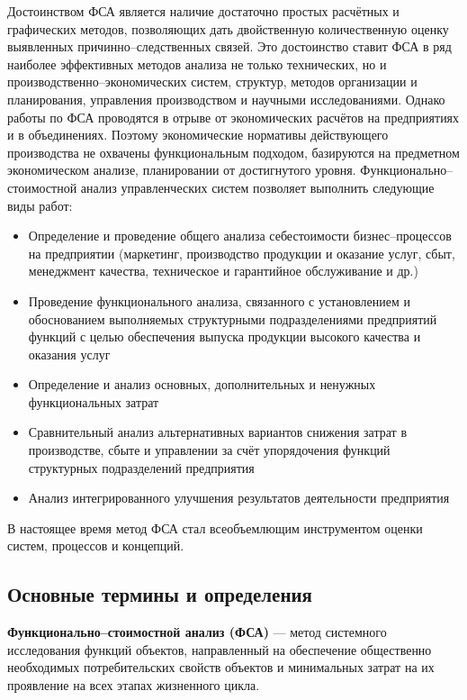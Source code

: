 Достоинством ФСА является наличие достаточно простых расчётных и графических
методов, позволяющих дать двойственную количественную оценку выявленных
причинно--следственных связей. Это достоинство ставит ФСА в ряд наиболее
эффективных методов анализа не только технических, но и
производственно--экономических систем, структур, методов организации и
планирования, управления производством и научными исследованиями. Однако работы
по ФСА проводятся в отрыве от экономических расчётов на предприятиях и в
объединениях.
Поэтому экономические нормативы действующего производства не охвачены
функциональным подходом, базируются на предметном экономическом анализе,
планировании от достигнутого уровня.
Функционально--стоимостной анализ управленческих систем позволяет выполнить
следующие виды работ:
\begin{itemize}
    \item Определение и проведение общего анализа себестоимости
    бизнес--процессов на предприятии (маркетинг, производство продукции и
    оказание услуг, сбыт, менеджмент качества, техническое и гарантийное
    обслуживание и др.)
    \item Проведение функционального анализа, связанного с установлением и
    обоснованием выполняемых структурными подразделениями предприятий функций с
    целью обеспечения выпуска продукции высокого качества и оказания услуг
    \item Определение и анализ основных, дополнительных и ненужных
    функциональных затрат
    \item Сравнительный анализ альтернативных вариантов снижения затрат в
    производстве, сбыте и управлении за счёт упорядочения функций структурных
    подразделений предприятия
    \item Анализ интегрированного улучшения результатов деятельности
предприятия
\end{itemize}

В настоящее время метод ФСА стал всеобъемлющим инструментом
оценки систем, процессов и концепций.

\newpage
\subsection{Основные термины и определения}

\textbf{Функционально--стоимостной анализ (ФСА)} --- метод системного
исследования функций объектов, направленный на обеспечение общественно
необходимых потребительских свойств объектов и минимальных затрат на их
проявление на всех этапах жизненного цикла.

